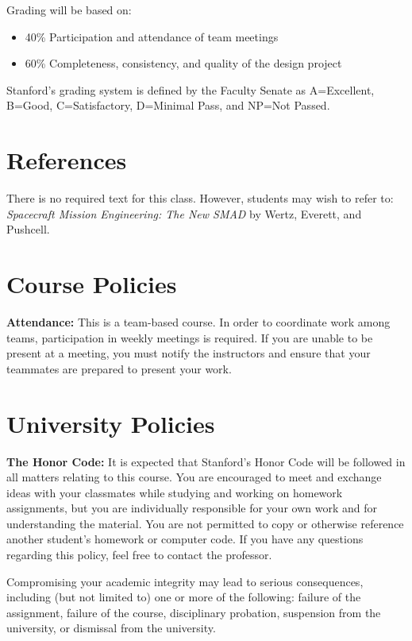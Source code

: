 \documentclass[11pt,letterpaper]{article}
\begin{document}
Grading will be based on:
\begin{itemize}
	\item 40\% Participation and attendance of team meetings
	\item 60\% Completeness, consistency, and quality of the design project
\end{itemize}
Stanford's grading system is defined by the Faculty Senate as A=Excellent, B=Good, C=Satisfactory, D=Minimal Pass, and NP=Not Passed.

\section*{References}

There is no required text for this class. However, students may wish to refer to: \textit{Spacecraft Mission Engineering: The New SMAD} by Wertz, Everett, and Pushcell.

\section*{Course Policies}

\textbf{Attendance:} This is a team-based course. In order to coordinate work among teams, participation in weekly meetings is required. If you are unable to be present at a meeting, you must notify the instructors and ensure that your teammates are prepared to present your work.

\section*{University Policies}

\textbf{The Honor Code:} It is expected that Stanford's Honor Code will be followed in all matters relating to this course. You are encouraged to meet and exchange ideas with your classmates while studying and working on homework assignments, but you are individually responsible for your own work and for understanding the material. You are not permitted to copy or otherwise reference another student's homework or computer code. If you have any questions regarding this policy, feel free to contact the professor.

Compromising your academic integrity may lead to serious consequences, including (but not limited to) one or more of the following: failure of the assignment, failure of the course, disciplinary probation, suspension from the university, or dismissal from the university.
\end{document}
